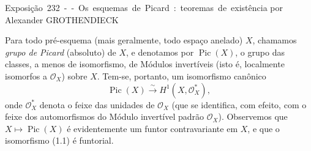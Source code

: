 \unit{Exposição 232 -- Os esquemas de Picard: teoremas de existência}
%
  {por Alexander GROTHENDIECK}


Para todo pré-esquema (mais geralmente, todo espaço anelado) $X$, chamamos
\emph{grupo de Picard} (absoluto) de $X$, e denotamos por
$\operatorname{Pic}(X)$, o grupo das classes, a menos de isomorfismo, de
Módulos invertíveis (isto é, localmente isomorfos a $\mathcal O_X$) sobre $X$.
Tem-se, portanto, um isomorfismo canônico
\begin{equation}
\operatorname{Pic}(X)\xrightarrow{\sim}H^1(X,\mathcal O_X^*),
\tag{1.1}
\end{equation}
onde $\mathcal O_X^*$ denota o feixe das unidades de $\mathcal O_X$ (que se
identifica, com efeito, com o feixe dos automorfismos do Módulo invertível
padrão $\mathcal O_X$). Observemos que
$X\longmapsto\operatorname{Pic}(X)$ é evidentemente um funtor contravariante
em $X$, e que o isomorfismo (1.1) é funtorial.


